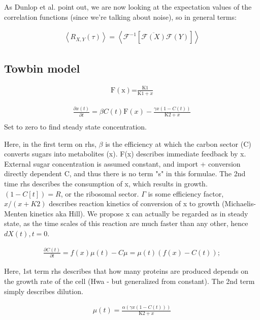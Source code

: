 As Dunlop et al. point out, we are now looking at the expectation values of the correlation functions (since we're talking about noise), so in general terms:

\begin{align}
\left< R_{X,Y}(\tau)\right > = 
\left< \mathcal{F}^{-1} \left[ \overline{\mathcal{F} (X)} \mathcal{F}(Y) \right] \right>
\end{align}

\subsection*{Towbin model}

\begin{align}
\text{F}(\text{x})\text{=}\frac{\text{K1}}{\text{K1}+x}
\end{align}

\begin{align}
\frac{\partial x(t)}{\partial t}=\beta  C(t) \text{F}(x)-\frac{\gamma  x \left(1-C(t)\right)}{\text{K2}+x} \\
\end{align}
Set to zero to find steady state concentration.

Here, in the first term on rhs, $\beta$ is the efficiency at which the carbon sector (C) converts sugars into metabolites (x). F(x) describes immediate feedback by x. External sugar concentration is assumed constant, and import + conversion directly dependent C, and thus there is no term "s" in this formulae.
The 2nd time rhs describes the consumption of x, which results in growth. $(1-C[t]) = R$, or the ribosomal sector. $\Gamma$ is some efficiency factor, $x/(x+K2)$ describes reaction kinetics of conversion of x to growth (Michaelis-Menten kinetics aka Hill). 
We propose x can actually be regarded as in steady state, as the time scales of this reaction are much faster than any other, hence $dX(t),t = 0$. 

\begin{align}
\frac{\partial C(t)}{\partial t}=f(x) \mu (t)-C \mu =\mu (t) \left(f(x)-C(t)\right);
\end{align}

Here, 1st term rhs describes that how many proteins are produced depends on the growth rate of the cell (Hwa - but generalized from constant). The 2nd term simply describes dilution.

\begin{align}
\mu (t)=\frac{\alpha  \left(\gamma  x \left(1-C(t)\right)\right)}{\text{K2}+x}
\end{align}


